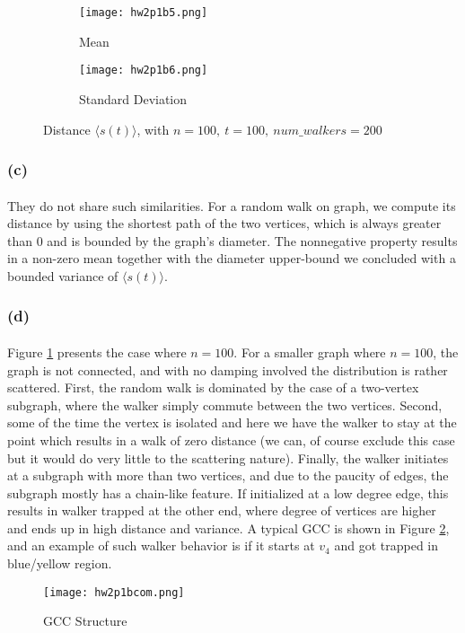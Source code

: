 \begin{figure}[h!]
	\centering
	\begin{subfigure}{.5\textwidth}
		\centering
		\texttt{[image: hw2p1b5.png]}
		\caption{Mean}
	\end{subfigure}%
	\begin{subfigure}{.5\textwidth}
		\centering
		\texttt{[image: hw2p1b6.png]}
		\caption{Standard Deviation}
	\end{subfigure}
	\caption{Distance $\langle s(t)\rangle$, with $n = 100,\ t = 100,\ num\_walkers = 200$}
	\label{fig:a3}
\end{figure}

\subsubsection*{(c)}
\paragraph{}
They do not share such similarities. For a random walk on graph, we compute its distance by using the shortest path of the two vertices, which is always greater than 0 and is bounded by the graph's diameter. The nonnegative property results in a non-zero mean together with the diameter upper-bound we concluded with a bounded variance of $\langle s(t)\rangle$.
\subsubsection*{(d)}
\paragraph{}
Figure \ref{fig:a3} presents the case where $n = 100$. For a smaller graph where $n=100$, the graph is not connected, and with no damping involved the distribution is rather scattered. First, the random walk is dominated by the case of a two-vertex subgraph, where the walker simply commute between the two vertices. Second, some of the time the vertex is isolated and here we have the walker to stay at the point which results in a walk of zero distance (we can, of course exclude this case but it would do very little to the scattering nature). Finally, the walker initiates at a subgraph with more than two vertices, and due to the paucity of edges, the subgraph mostly has a chain-like feature. If initialized at a low degree edge, this results in walker trapped at the other end, where degree of vertices are higher and ends up in high distance and variance. A typical GCC is shown in Figure \ref{fig:a4}, and an example of such walker behavior is if it starts at $v_4$ and got trapped in blue/yellow region.
\begin{figure} [h]
	\centering
	\texttt{[image: hw2p1bcom.png]}
	\caption{GCC Structure}
	\label{fig:a4}
\end{figure}
